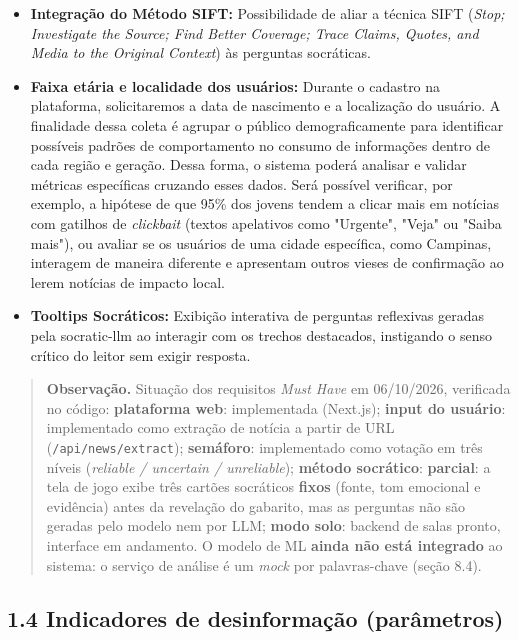 \documentclass[
  brazilian,
  11pt,
]{article}
\providecommand{\tightlist}{%
  \setlength{\itemsep}{0pt}\setlength{\parskip}{0pt}}
\begin{document}
\begin{itemize}
\tightlist
\item
  \textbf{Integração do Método SIFT:} Possibilidade de aliar a técnica SIFT (\emph{Stop;} \emph{Investigate the Source; Find Better Coverage; Trace Claims, Quotes, and Media to the Original Context}) às perguntas socráticas.
\item
  \textbf{Faixa etária e localidade dos usuários:} Durante o cadastro na plataforma, solicitaremos a data de nascimento e a localização do usuário. A finalidade dessa coleta é agrupar o público demograficamente para identificar possíveis padrões de comportamento no consumo de informações dentro de cada região e geração. Dessa forma, o sistema poderá analisar e validar métricas específicas cruzando esses dados. Será possível verificar, por exemplo, a hipótese de que 95\% dos jovens tendem a clicar mais em notícias com gatilhos de \emph{clickbait} (textos apelativos como "Urgente", "Veja" ou "Saiba mais"), ou avaliar se os usuários de uma cidade específica, como Campinas, interagem de maneira diferente e apresentam outros vieses de confirmação ao lerem notícias de impacto local.
\item
  \textbf{Tooltips Socráticos:} Exibição interativa de perguntas reflexivas geradas pela socratic-llm ao interagir com os trechos destacados, instigando o senso crítico do leitor sem exigir resposta.
\end{itemize}

\begin{quote}
\textbf{Observação.} Situação dos requisitos \emph{Must Have} em 06/10/2026, verificada no código: \textbf{plataforma web}: implementada (Next.js); \textbf{input do usuário}: implementado como extração de notícia a partir de URL (\texttt{/api/news/extract}); \textbf{semáforo}: implementado como votação em três níveis (\emph{reliable / uncertain / unreliable}); \textbf{método socrático}: \textbf{parcial}: a tela de jogo exibe três cartões socráticos \textbf{fixos} (fonte, tom emocional e evidência) antes da revelação do gabarito, mas as perguntas não são geradas pelo modelo nem por LLM; \textbf{modo solo}: backend de salas pronto, interface em andamento. O modelo de ML \textbf{ainda não está integrado} ao sistema: o serviço de análise é um \emph{mock} por palavras-chave (seção 8.4).
\end{quote}

\subsection{1.4 Indicadores de desinformação (parâmetros)}\label{indicadores-de-desinformauxe7uxe3o-paruxe2metros}
\end{document}
